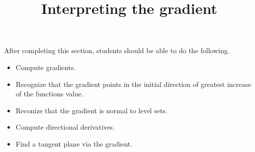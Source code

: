 \documentclass{ximera}
\title{Interpreting the gradient}
\begin{document}
\begin{abstract}
\end{abstract}

\maketitle

\begin{sectionOutcomes}

After completing this section, students should be able to do the following.

\begin{itemize}
\item Compute gradients.
\item Recognize that the gradient points in the initial direction of
  greatest increase of the functions value.
\item Reconize that the gradient is normal to level sets.
\item Compute directional derivatives.
\item Find a tangent plane via the gradient.
\end{itemize}

\end{sectionOutcomes}
\end{document}
